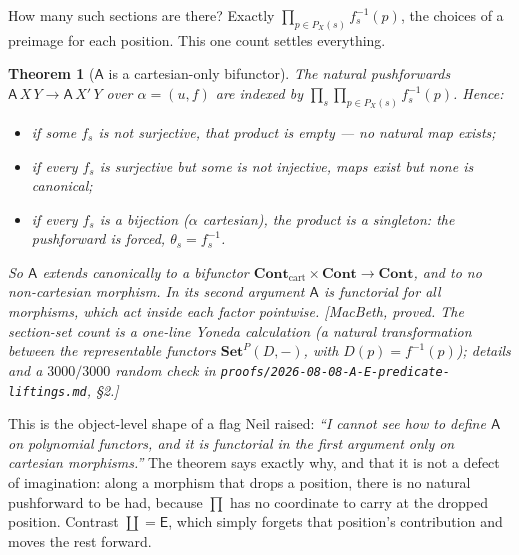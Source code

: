 \documentclass[11pt,a4paper]{book}
\newcommand{\Set}{\mathbf{Set}}
\newcommand{\Cont}{\mathbf{Cont}}
\theoremstyle{plain}
\newtheorem{Theorem}{Theorem}[chapter]
\theoremstyle{definition}
\theoremstyle{remark}
\newcommand{\prov}[1]{\hfill\textsf{\footnotesize[#1]}}
\begin{document}
How many such sections are there? Exactly $\prod_{p\in P_X(s)}f_s^{-1}(p)$, the
choices of a preimage for each position. This one count settles everything.

\begin{Theorem}[$\mathsf A$ is a cartesian-only bifunctor]\label{thm:A-cartesian}
The natural pushforwards $\mathsf A\,X\,Y\to\mathsf A\,X'\,Y$ over
$\alpha=(u,f)$ are indexed by $\prod_{s}\prod_{p\in P_X(s)}f_s^{-1}(p)$. Hence:
\begin{itemize}[nosep]
  \item if some $f_s$ is \emph{not surjective}, that product is \emph{empty} ---
        \emph{no} natural map exists;
  \item if every $f_s$ is surjective but some is not injective, maps exist but
        \emph{none is canonical};
  \item if every $f_s$ is a \emph{bijection} ($\alpha$ \emph{cartesian}), the
        product is a \emph{singleton}: the pushforward is forced, $\theta_s=f_s^{-1}$.
\end{itemize}
So $\mathsf A$ extends canonically to a bifunctor $\Cont_{\mathrm{cart}}\times\Cont\to\Cont$,
and to no non-cartesian morphism. In its \emph{second} argument $\mathsf A$ is
functorial for all morphisms, which act inside each factor pointwise.
\prov{MacBeth, proved. The section-set count is a one-line Yoneda calculation
(a natural transformation between the representable functors $\Set^{P}(D,-)$,
with $D(p)=f^{-1}(p)$); details and a $3000/3000$ random check in
\texttt{proofs/2026-08-08-A-E-predicate-liftings.md}, \S2.}
\end{Theorem}

This is the object-level shape of a flag Neil raised: \emph{``I cannot see how to
define $\mathsf A$ on polynomial functors, and it is functorial in the first
argument only on cartesian morphisms.''} The theorem says exactly why, and that it
is not a defect of imagination: along a morphism that drops a position, there is no
natural pushforward to be had, because $\prod$ has no coordinate to carry at the
dropped position. Contrast $\coprod=\mathsf E$, which simply forgets that position's
contribution and moves the rest forward.
\end{document}

